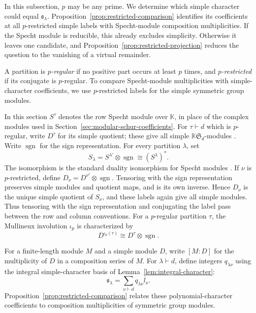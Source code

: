 \documentclass[12pt,reqno,a4paper]{amsart}
\numberwithin{equation}{section}
\numberwithin{figure}{section}
\theoremstyle{plain}
\theoremstyle{definition}
\newcommand{\Sym}{\mathfrak S}
\begin{document}
In this subsection, $p$ may be any prime.  We determine which simple character could equal
$\mathfrak{s}_\lambda$.  Proposition~\ref{prop:restricted-comparison}
identifies its coefficients at all $p$-restricted simple labels with
Specht-module composition multiplicities.  If the Specht module is
reducible, this already excludes simplicity.  Otherwise it leaves one
candidate, and Proposition~\ref{prop:restricted-projection} reduces
the question to the vanishing of a virtual remainder.

A partition is \emph{$p$-regular} if no positive part occurs at least
$p$ times, and \emph{$p$-restricted} if its conjugate is
$p$-regular.  To compare Specht-module multiplicities with
simple-character coefficients, we use $p$-restricted labels for
the simple symmetric group modules.

In this section $S^\tau$ denotes the row Specht module over
$\mathbb K$, in place of the complex modules used in Section~\ref{sec:modular-schur-coefficients}.
For $\tau\vdash d$ which is $p$-regular,
write $D^\tau$ for its simple quotient; these give all simple
$\mathbb K\Sym_d$-modules
\cite[Theorems~4.9, 11.1, and~11.5]{JamesBook}.  Write
$\operatorname{sgn}$ for the sign representation.  For every partition
$\lambda$, set
\begin{equation}\label{eq:dual-specht-convention}
S_\lambda=S^{\lambda'}\otimes\operatorname{sgn}
\cong (S^\lambda)^*.
\end{equation}
The isomorphism is the standard duality isomorphism for Specht modules
\cite[Theorem~8.15]{JamesBook}.
If $\nu$ is $p$-restricted, define
$D_\nu=D^{\nu'}\otimes\operatorname{sgn}$.  Tensoring with the
sign representation preserves simple modules and quotient maps,
and is its own inverse.  Hence $D_\nu$ is the
unique simple quotient of $S_\nu$, and these labels again give all
simple modules.  Thus tensoring with the sign representation and
conjugating the label pass between the row and column conventions.
For a $p$-regular partition $\tau$,
the Mullineux involution $\iota_p$ is characterized by
\begin{equation}\label{eq:mullineux-convention}
D^{\iota_p(\tau)}\cong D^\tau\otimes\operatorname{sgn}.
\end{equation}

For a finite-length module $M$ and a simple module $D$, write
$[M:D]$ for the multiplicity of $D$ in a composition series of $M$.
For $\lambda\vdash d$, define integers $q_{\lambda\nu}$ using the
integral simple-character basis of Lemma~\ref{lem:integral-character}:
\[
 \mathfrak{s}_\lambda=\sum_{\nu\vdash d}q_{\lambda\nu}l_\nu.
\]
Proposition~\ref{prop:restricted-comparison} relates these
polynomial-character coefficients to composition multiplicities
of symmetric group modules.
\end{document}
